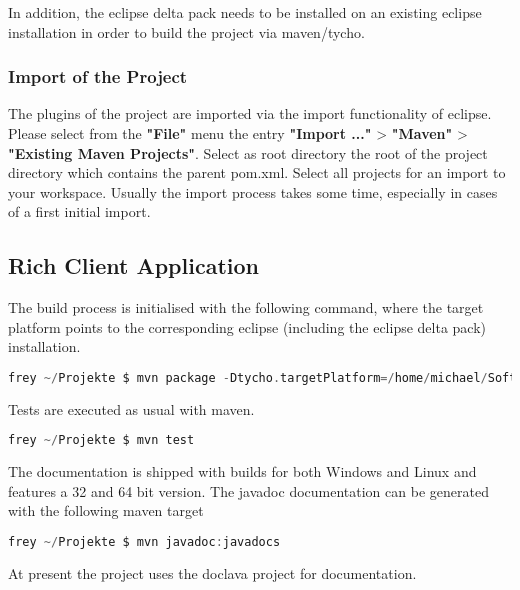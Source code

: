In addition, the eclipse delta pack needs to be installed on an existing eclipse
installation in order to build the project via maven/tycho.
 
\subsubsection{Import of the Project}
The plugins of the project are imported via the import functionality of eclipse.
Please select from the \textbf{"File"} menu the entry \textbf{"Import ..."} > 
\textbf{"Maven"} > \textbf{"Existing Maven Projects"}. Select as root
directory the root of the project directory which contains the parent pom.xml. 
Select all projects for an import to your workspace. Usually the import process
takes some time, especially in cases of a first initial import. 

\subsection{Rich Client Application}
The build process is initialised with the following command, where the target 
platform points to the corresponding eclipse (including the eclipse delta pack) 
installation.
\begin{lstlisting}[language=C, caption={\emph{bla}},label={lst:shell}]
frey ~/Projekte $ mvn package -Dtycho.targetPlatform=/home/michael/Software/eclipse
\end{lstlisting}
Tests are executed as usual with maven.
\begin{lstlisting}[language=C, caption={\emph{bla}},label={lst:shell}]
frey ~/Projekte $ mvn test
\end{lstlisting}
The documentation is shipped with builds for both Windows and Linux and features
a 32 and 64 bit version. The javadoc documentation can be generated with the 
following maven target
\begin{lstlisting}[language=C, caption={\emph{bla}},label={lst:shell}]
frey ~/Projekte $ mvn javadoc:javadocs
\end{lstlisting}
At present the project uses the doclava project for documentation.


